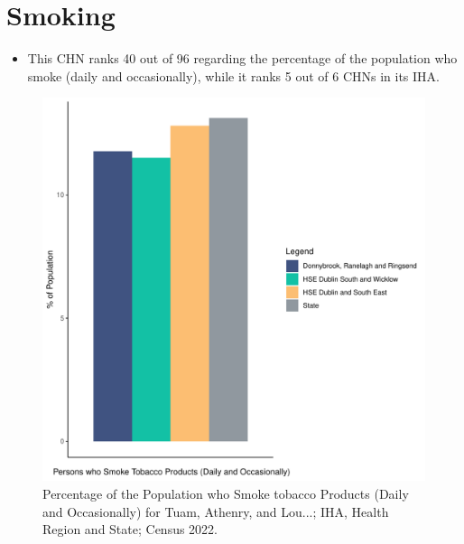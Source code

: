 \documentclass{article}
\begin{document}
\pagebreak

\section{Smoking}\label{sect:Smoking}
\begin{itemize}
\item This CHN ranks  40 out of 96 regarding the percentage of the population who smoke (daily and occasionally), while it ranks   5 out of 6 CHNs in its IHA.
\end{itemize}
\begin{figure}[H]
	\centering
	\includegraphics[width = 120mm]{../figures/SmokingED.pdf}
	\caption{Percentage of the Population who Smoke tobacco Products (Daily and Occasionally) for Tuam, Athenry, and Lou...; IHA, Health Region and State; Census 2022.}
	\label{fig:2ae19629-1a6a-13a3-e055-000000000001}
	\end{figure}
	
\end{document}
